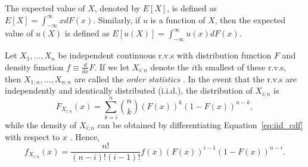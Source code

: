 The expected value of $X$, denoted by $E[X]$, is defined as $E[X] = \int_{-\infty}^{\infty} xdF(x)$. Similarly, if $u$ is a function of $X$, then the expected value of $u(X)$ is defined as $E[u(X)] = \int_{-\infty}^{\infty} u(x)dF(x)$.

Let $X_1, \ldots, X_n$ be independent continuous r.v.s with distribution function $F$ and density function $f\equiv \frac{d}{dx}F$. If we let $X_{i:n}$ denote the $i$th smallest of these r.v.s, then $X_{1:n}, \ldots,X_{n:n}$ are called the \emph{order statistics} \cite{Arnold08,David03}. In the event that the r.v.s are independently and identically distributed (i.i.d.), the distribution of $X_{i:n}$ is
\begin{equation}
	\label{eq:iid_cdf}
	F_{X_{i:n}}(x) = \sum_{k=i}^{n} \binom{n}{k} (F(x))^k (1-F(x))^{n-k},
\end{equation}
while the density of $X_{i:n}$ can be obtained by differentiating Equation~\eqref{eq:iid_cdf} with respect to $x$ \cite{Ross10}. Hence,
\begin{equation}
	\label{eq:iid_pdf}
	f_{X_{i:n}}(x) = \frac{n!}{(n-i)!(i-1)!} f(x) (F(x))^{i-1} (1-F(x))^{n-i}.
\end{equation}

